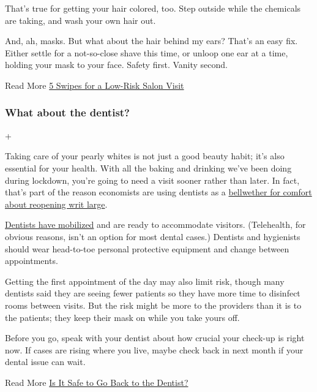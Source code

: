 That's true for getting your hair colored, too. Step outside while the
chemicals are taking, and wash your own hair out.

And, ah, masks. But what about the hair behind my ears? That's an easy
fix. Either settle for a not-so-close shave this time, or unloop one ear
at a time, holding your mask to your face. Safety first. Vanity second.

Read More
\href{https://www.nytimes3xbfgragh.onion/interactive/2020/06/17/burst/5-swipes-for-a-low-risk-salon-visit.html}{5
Swipes for a Low-Risk Salon Visit}

\hypertarget{what-about-the-dentist}{%
\subsubsection{What about the dentist?}\label{what-about-the-dentist}}

+

Taking care of your pearly whites is not just a good beauty habit; it's
also essential for your health. With all the baking and drinking we've
been doing during lockdown, you're going to need a visit sooner rather
than later. In fact, that's part of the reason economists are using
dentists as a
\href{https://www.nytimes3xbfgragh.onion/2020/06/10/upshot/dentists-coronavirus-economic-indicator.html}{bellwether
for comfort about reopening writ large}.

\href{https://www.nytimes3xbfgragh.onion/2020/06/08/well/live/dental-care-dentistry-teeth-coronavirus.html}{Dentists
have mobilized} and are ready to accommodate visitors. (Telehealth, for
obvious reasons, isn't an option for most dental cases.) Dentists and
hygienists should wear head-to-toe personal protective equipment and
change between appointments.

Getting the first appointment of the day may also limit risk, though
many dentists said they are seeing fewer patients so they have more time
to disinfect rooms between visits. But the risk might be more to the
providers than it is to the patients; they keep their mask on while you
take yours off.

Before you go, speak with your dentist about how crucial your check-up
is right now. If cases are rising where you live, maybe check back in
next month if your dental issue can wait.

Read More
\href{https://www.nytimes3xbfgragh.onion/2020/06/25/health/dentist-coronavirus-safe.html}{Is
It Safe to Go Back to the Dentist?}

